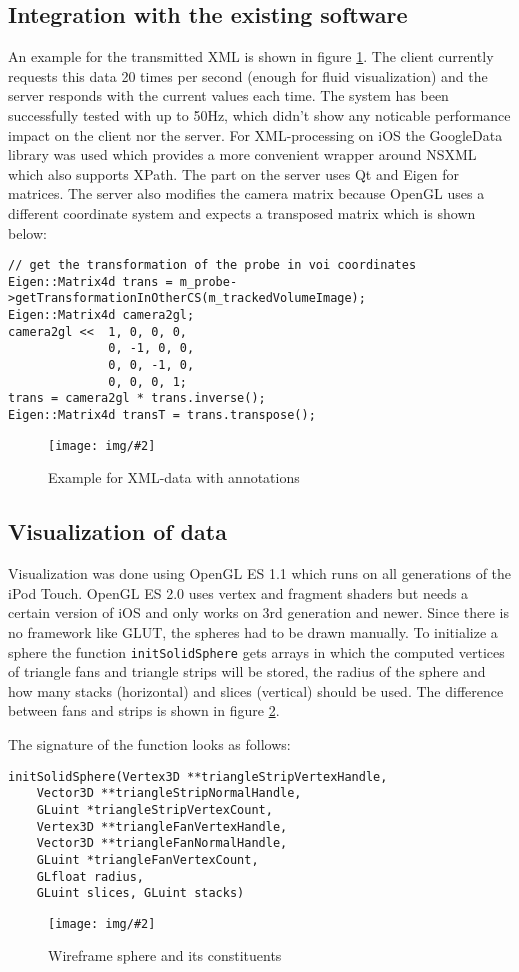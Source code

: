 \documentclass{scrartcl}
\newcommand{\graphic}[3][width=\linewidth] %
{
  \begin{figure}[h!t]
    \centering
    \texttt{[image: img/\#2]}
    \caption{#3}
    \label{fig:#2}
  \end{figure}
}
\newcommand{\refFigure}[1]{figure \ref{fig:#1}}
\begin{document}
\subsection{Integration with the existing software}
An example for the transmitted XML is shown in \refFigure{data}. The client currently requests this data 20 times per second (enough for fluid visualization) and the server responds with the current values each time. The system has been successfully tested with up to 50Hz, which didn't show any noticable performance impact on the client nor the server.
For XML-processing on iOS the GoogleData library was used which provides a more convenient wrapper around NSXML which also supports XPath.
The part on the server uses Qt \cite{qt} and Eigen \cite{eigen} for matrices. The server also modifies the camera matrix because OpenGL uses a different coordinate system and expects a transposed matrix which is shown below:
\begin{verbatim}
// get the transformation of the probe in voi coordinates
Eigen::Matrix4d trans = m_probe->getTransformationInOtherCS(m_trackedVolumeImage);				
Eigen::Matrix4d camera2gl;
camera2gl <<  1, 0, 0, 0,
              0, -1, 0, 0,
              0, 0, -1, 0,
              0, 0, 0, 1;
trans = camera2gl * trans.inverse();
Eigen::Matrix4d transT = trans.transpose();
\end{verbatim}
\graphic[scale=.5]{data}{Example for XML-data with annotations}


\subsection{Visualization of data}
Visualization was done using OpenGL ES 1.1 which runs on all generations of the iPod Touch. OpenGL ES 2.0 uses vertex and fragment shaders but needs a certain version of iOS and only works on 3rd generation and newer.
Since there is no framework like GLUT, the spheres had to be drawn manually. To initialize a sphere the function \verb|initSolidSphere| gets arrays in which the computed vertices of triangle fans and triangle strips will be stored, the radius of the sphere and how many stacks (horizontal) and slices (vertical) should be used.
The difference between fans and strips is shown in \refFigure{sphere}.

The signature of the function looks as follows:
\begin{verbatim}
initSolidSphere(Vertex3D **triangleStripVertexHandle,
    Vector3D **triangleStripNormalHandle,
    GLuint *triangleStripVertexCount,
    Vertex3D **triangleFanVertexHandle,
    Vector3D **triangleFanNormalHandle,
    GLuint *triangleFanVertexCount,
    GLfloat radius,
    GLuint slices, GLuint stacks)
\end{verbatim}
\graphic[scale=.5]{sphere}{Wireframe sphere and its constituents \cite{wikipedia}}
\end{document}
